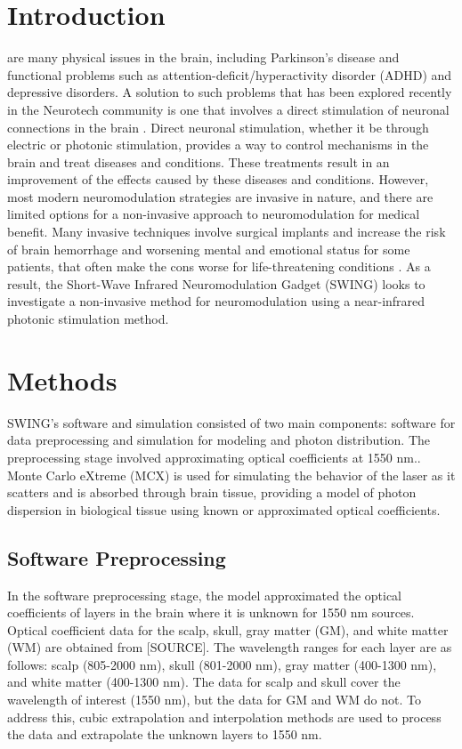 \documentclass[journal,twoside,web]{ieeecolor}
\begin{document}
\section{Introduction}
\label{sec:introduction}
 are many physical issues in the brain, including Parkinson's disease and functional 
problems such as attention-deficit/hyperactivity disorder (ADHD) and depressive disorders. 
A solution to such problems that has been explored recently in the Neurotech community is one that involves a direct stimulation of  
neuronal connections in the brain \cite{b1,b2,b3}. Direct neuronal stimulation, whether it be through electric or photonic 
stimulation, provides a way to control mechanisms in the brain and treat diseases and conditions. These treatments result 
in an improvement of the effects caused by these diseases and conditions. However, most modern neuromodulation strategies 
are invasive in nature, and there are limited options for a non-invasive approach to neuromodulation for medical benefit. Many invasive 
techniques involve surgical implants and increase the risk of brain hemorrhage and worsening mental and emotional status for some patients,  
that often make the cons worse for life-threatening conditions \cite{b1,b4}. As a result, the Short-Wave Infrared Neuromodulation Gadget (SWING) 
looks to investigate a non-invasive method for neuromodulation using a near-infrared photonic stimulation method. 


\section{Methods}
\label{sec:methods}
SWING's software and simulation consisted of two main components: software for data preprocessing and simulation for modeling and photon distribution. 
The preprocessing stage involved approximating optical coefficients at 1550 nm.. Monte Carlo eXtreme (MCX) is used for simulating the 
behavior of the laser as it scatters and is absorbed through brain tissue, providing a model of photon dispersion in biological tissue using known or 
approximated optical coefficients.

\subsection{Software Preprocessing}
In the software preprocessing stage, the model approximated the optical coefficients of layers in the brain where it is unknown for 1550 nm sources. 
Optical coefficient data for the scalp, skull, gray matter (GM), and white matter (WM) are obtained from [SOURCE]. The wavelength ranges for each layer are as follows: scalp (805-2000 nm), 
skull (801-2000 nm), gray matter (400-1300 nm), and white matter (400-1300 nm). The data for scalp and skull cover the wavelength of interest (1550 nm), but the data 
for GM and WM do not. To address this, cubic extrapolation and interpolation methods are used to process the data and extrapolate the unknown layers to 1550 nm. 
\end{document}
